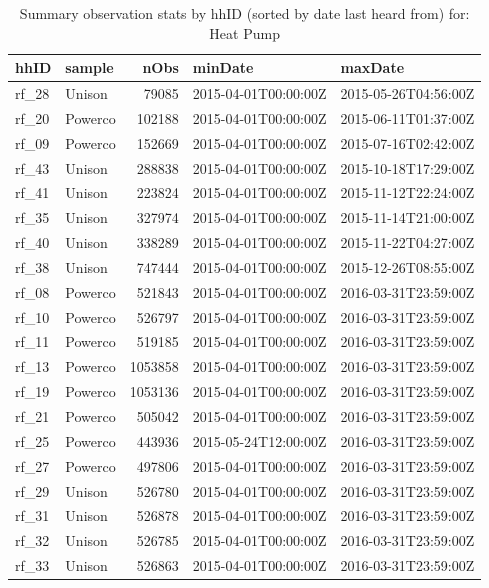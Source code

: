 \documentclass[]{article}
\begin{document}
\begin{table}
\caption{\label{tab:summaryTable}Summary observation stats by hhID (sorted by date last heard from) for: Heat Pump}
\centering
\begin{tabular}[t]{l|l|r|l|l}
\hline
hhID & sample & nObs & minDate & maxDate\\
\hline
rf\_28 & Unison & 79085 & 2015-04-01T00:00:00Z & 2015-05-26T04:56:00Z\\
\hline
rf\_20 & Powerco & 102188 & 2015-04-01T00:00:00Z & 2015-06-11T01:37:00Z\\
\hline
rf\_09 & Powerco & 152669 & 2015-04-01T00:00:00Z & 2015-07-16T02:42:00Z\\
\hline
rf\_43 & Unison & 288838 & 2015-04-01T00:00:00Z & 2015-10-18T17:29:00Z\\
\hline
rf\_41 & Unison & 223824 & 2015-04-01T00:00:00Z & 2015-11-12T22:24:00Z\\
\hline
rf\_35 & Unison & 327974 & 2015-04-01T00:00:00Z & 2015-11-14T21:00:00Z\\
\hline
rf\_40 & Unison & 338289 & 2015-04-01T00:00:00Z & 2015-11-22T04:27:00Z\\
\hline
rf\_38 & Unison & 747444 & 2015-04-01T00:00:00Z & 2015-12-26T08:55:00Z\\
\hline
rf\_08 & Powerco & 521843 & 2015-04-01T00:00:00Z & 2016-03-31T23:59:00Z\\
\hline
rf\_10 & Powerco & 526797 & 2015-04-01T00:00:00Z & 2016-03-31T23:59:00Z\\
\hline
rf\_11 & Powerco & 519185 & 2015-04-01T00:00:00Z & 2016-03-31T23:59:00Z\\
\hline
rf\_13 & Powerco & 1053858 & 2015-04-01T00:00:00Z & 2016-03-31T23:59:00Z\\
\hline
rf\_19 & Powerco & 1053136 & 2015-04-01T00:00:00Z & 2016-03-31T23:59:00Z\\
\hline
rf\_21 & Powerco & 505042 & 2015-04-01T00:00:00Z & 2016-03-31T23:59:00Z\\
\hline
rf\_25 & Powerco & 443936 & 2015-05-24T12:00:00Z & 2016-03-31T23:59:00Z\\
\hline
rf\_27 & Powerco & 497806 & 2015-04-01T00:00:00Z & 2016-03-31T23:59:00Z\\
\hline
rf\_29 & Unison & 526780 & 2015-04-01T00:00:00Z & 2016-03-31T23:59:00Z\\
\hline
rf\_31 & Unison & 526878 & 2015-04-01T00:00:00Z & 2016-03-31T23:59:00Z\\
\hline
rf\_32 & Unison & 526785 & 2015-04-01T00:00:00Z & 2016-03-31T23:59:00Z\\
\hline
rf\_33 & Unison & 526863 & 2015-04-01T00:00:00Z & 2016-03-31T23:59:00Z\\

\end{tabular}
\end{table}
\end{document}
